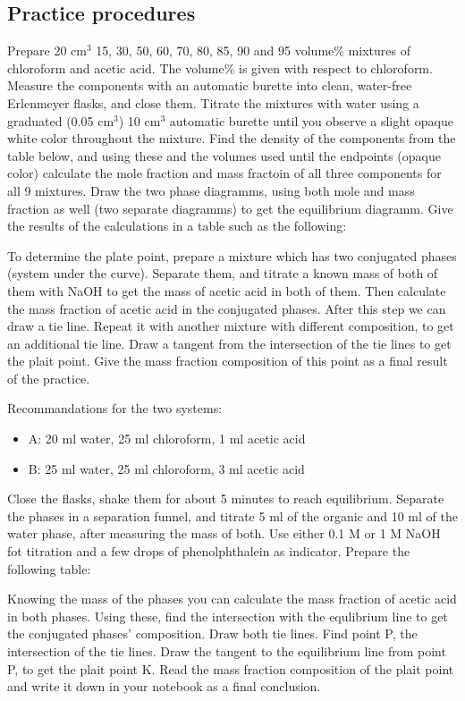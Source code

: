 \subsection{Practice procedures}

Prepare 20 cm$^3$ 15, 30, 50, 60, 70, 80, 85, 90 and 95 volume\% mixtures of chloroform and acetic acid. The volume\% is given with respect to chloroform. Measure the components with an automatic burette into clean, water-free Erlenmeyer flasks, and close them. Titrate the mixtures with water using a graduated (0.05 cm$^3$) 10 cm$^3$ automatic burette until you observe a slight opaque white color throughout the mixture. Find the density of the components from the table below, and using these and the volumes used until the endpoints (opaque color) calculate the mole fraction and mass fractoin of all three components for all 9 mixtures. Draw the two phase diagramms, using both mole and mass fraction as well (two separate diagramms) to get the equilibrium diagramm. Give the results of the calculations in a table such as the following:


To determine the plate point, prepare a mixture which has two conjugated phases (system under the curve). Separate them, and titrate a known mass of both of them with NaOH to get the mass of acetic acid in both of them. Then calculate the mass fraction of acetic acid in the conjugated phases. After this step we can draw a tie line. Repeat it with another mixture with different composition, to get an additional tie line. Draw a tangent from the intersection of the tie lines to get the plait point. Give the mass fraction composition of this point as a final result of the practice.

Recommandations for the two systems:

\begin{itemize}
\item A: 20 ml water, 25 ml chloroform, 1 ml acetic acid
\item B: 25 ml water, 25 ml chloroform, 3 ml acetic acid
\end{itemize}

Close the flasks, shake them for about 5 minutes to reach equilibrium. Separate the phases in a separation funnel, and titrate 5 ml of the organic and 10 ml of the water phase, after measuring the mass of both. Use either 0.1 M or 1 M NaOH fot titration and a few drops of phenolphthalein as indicator. Prepare the following table:


Knowing the mass of the phases you can calculate the mass fraction of acetic acid in both phases. Using these, find the intersection with the equlibrium line to get the conjugated phases' composition. Draw both tie lines. Find point P, the intersection of the tie lines. Draw the tangent to the equilibrium line from point P, to get the plait point K. Read the mass fraction composition of the plait point and write it down in your notebook as a final conclusion.  


